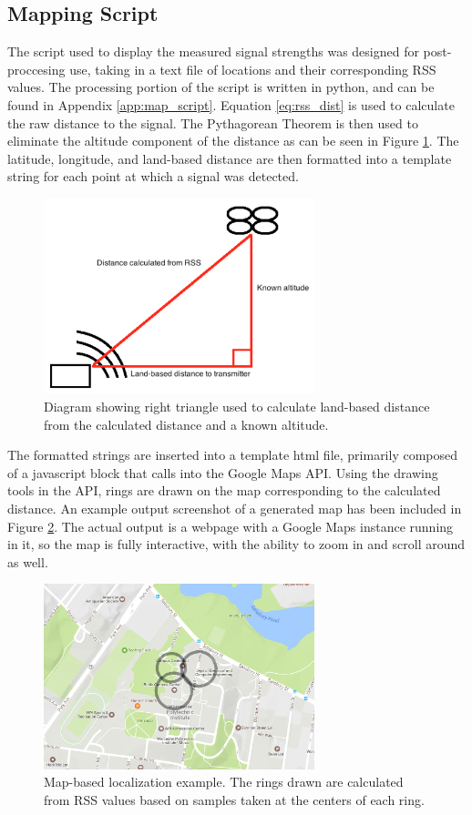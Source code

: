 \subsection{Mapping Script}
The script used to display the measured signal strengths was designed for post-proccesing use, taking in a text file of locations and their corresponding RSS values. The processing portion of the script is written in python, and can be found in Appendix \ref{app:map_script}. Equation \ref{eq:rss_dist} is used to calculate the raw distance to the signal. The Pythagorean Theorem is then used to eliminate the altitude component of the distance as can be seen in Figure \ref{fig:dist_pyth}. The latitude, longitude, and land-based distance are then formatted into a template string for each point at which a signal was detected.\par
\begin{figure}[h!]
\centering
\includegraphics[width=0.70\textwidth]{img/distance_pythag_diagram.png}
\caption{Diagram showing right triangle used to calculate land-based distance from the calculated distance and a known altitude.}
\label{fig:dist_pyth}
\end{figure}
The formatted strings are inserted into a template html file, primarily composed of a javascript block that calls into the Google Maps API. Using the drawing tools in the API, rings are drawn on the map corresponding to the calculated distance. An example output screenshot of a generated map has been included in Figure \ref{fig:map_localize}. The actual output is a webpage with a Google Maps instance running in it, so the map is fully interactive, with the ability to zoom in and scroll around as well.
\begin{figure}[h!]
\centering
\includegraphics[width=0.70\textwidth]{img/localization_map_visualization.png}
\caption{Map-based localization example. The rings drawn are calculated from RSS values based on samples taken at the centers of each ring.}
\label{fig:map_localize}
\end{figure}

